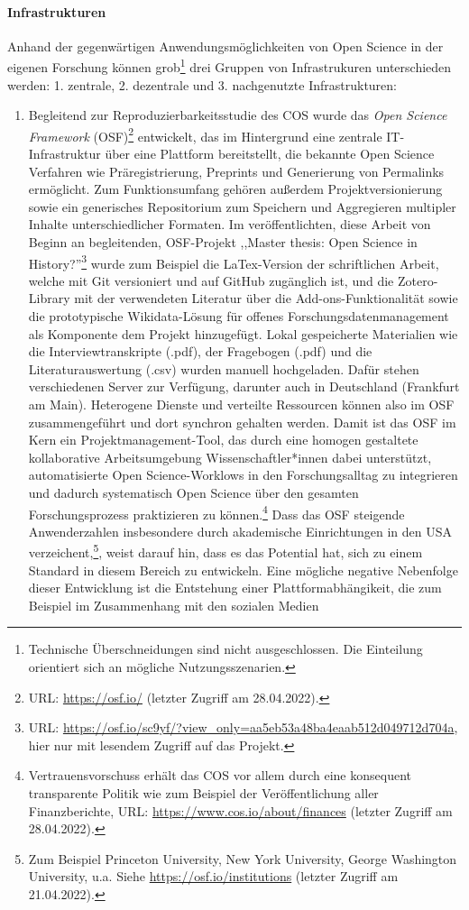 \paragraph{Infrastrukturen} Anhand der gegenwärtigen Anwendungsmöglichkeiten von Open Science in der eigenen Forschung können grob\footnote{Technische Überschneidungen sind nicht ausgeschlossen. Die Einteilung orientiert sich an mögliche Nutzungsszenarien.} drei Gruppen von Infrastrukuren unterschieden werden: 1. zentrale, 2. dezentrale und 3. nachgenutzte Infrastrukturen:

\begin{enumerate}
\item Begleitend zur Reproduzierbarkeitsstudie des COS wurde das \textit{Open Science Framework} (OSF)\footnote{URL: \url{https://osf.io/} (letzter Zugriff am 28.04.2022).} entwickelt, das im Hintergrund eine zentrale IT- Infrastruktur über eine Plattform bereitstellt, die bekannte Open Science Verfahren wie Präregistrierung, Preprints und Generierung von Permalinks ermöglicht. Zum Funktionsumfang gehören außerdem Projektversionierung sowie ein generisches Repositorium zum Speichern und Aggregieren multipler Inhalte unterschiedlicher Formaten. Im veröffentlichten, diese Arbeit von Beginn an begleitenden, OSF-Projekt ,,Master thesis: Open Science in History?''\footnote{URL: \url{https://osf.io/sc9yf/?view_only=aa5eb53a48ba4eaab512d049712d704a}, hier nur mit lesendem Zugriff auf das Projekt.} wurde zum Beispiel die LaTex-Version der schriftlichen Arbeit, welche mit Git versioniert und auf GitHub zugänglich ist, und die Zotero-Library mit der verwendeten Literatur über die Add-ons-Funktionalität sowie die prototypische Wikidata-Lösung für offenes Forschungsdatenmanagement als Komponente dem Projekt hinzugefügt. Lokal gespeicherte Materialien wie die Interviewtranskripte (.pdf), der Fragebogen (.pdf) und die Literaturauswertung (.csv) wurden manuell hochgeladen. Dafür stehen verschiedenen Server zur Verfügung, darunter auch in Deutschland (Frankfurt am Main). Heterogene Dienste und verteilte Ressourcen können also im OSF zusammengeführt und dort synchron gehalten werden. Damit ist das OSF im Kern ein Projektmanagement-Tool, das durch eine homogen gestaltete kollaborative Arbeitsumgebung Wissenschaftler*innen dabei unterstützt, automatisierte Open Science-Worklows in den Forschungsalltag zu integrieren und dadurch systematisch Open Science über den gesamten Forschungsprozess praktizieren zu können.\footnote{Vertrauensvorschuss erhält das COS vor allem durch eine konsequent transparente Politik wie zum Beispiel der Veröffentlichung aller Finanzberichte, URL: \url{https://www.cos.io/about/finances} (letzter Zugriff am 28.04.2022).} Dass das OSF steigende Anwenderzahlen insbesondere durch akademische Einrichtungen in den USA verzeichent,\footnote{Zum Beispiel Princeton University, New York University, George Washington University, u.a. Siehe \url{https://osf.io/institutions} (letzter Zugriff am 21.04.2022).}, weist darauf hin, dass es das Potential hat, sich zu einem Standard in diesem Bereich zu entwickeln. Eine mögliche negative Nebenfolge dieser Entwicklung ist die Entstehung einer Plattformabhängikeit, die zum Beispiel im Zusammenhang mit den sozialen Medien 
\end{enumerate}
